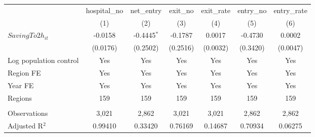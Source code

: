 \begingroup
\centering
\begin{tabular}{lcccccc}
   \toprule
                          & hospital\_no  & net\_entry    & exit\_no  & exit\_rate  & entry\_no  & entry\_rate \\    
                          & (1)           & (2)           & (3)       & (4)         & (5)        & (6)\\  
   \midrule 
   $SavingTo2h_{it}$      & -0.0158       & -0.4445$^{*}$ & -0.1787   & 0.0017      & -0.4730    & 0.0002\\   
                          & (0.0176)      & (0.2502)      & (0.2516)  & (0.0032)    & (0.3420)   & (0.0047)\\   
   Log population control & Yes           & Yes           & Yes       & Yes         & Yes        & Yes\\  
   Region FE              & Yes           & Yes           & Yes       & Yes         & Yes        & Yes\\  
   Year FE                & Yes           & Yes           & Yes       & Yes         & Yes        & Yes\\  
   Regions                & 159           & 159           & 159       & 159         & 159        & 159\\  
    \\
   Observations           & 3,021         & 2,862         & 3,021     & 3,021       & 2,862      & 2,862\\  
   Adjusted R$^2$         & 0.99410       & 0.33420       & 0.76169   & 0.14687     & 0.70934    & 0.06275\\  
   \bottomrule
\end{tabular}
\par\endgroup
